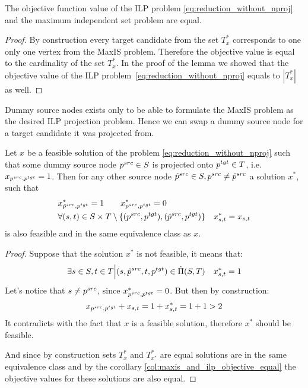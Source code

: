 \begin{corollary} \label{col:maxis_and_ilp_objective_equal}
  The objective function value of the ILP problem \eqref{eq:reduction_without_nproj} and the maximum independent
  set problem are equal.
\end{corollary}
\begin{proof}
  By construction every target candidate from the set \( T^*_x \) corresponds to one only one vertex
  from the MaxIS problem. Therefore the objective value is equal to the cardinality of the set \(  T^*_x \).
  In the proof of the lemma we showed that the objective value of the ILP problem~\eqref{eq:reduction_without_nproj}
  equals to \( | T^*_x| \) as well.
\end{proof}

Dummy source nodes exists only to be able to formulate the MaxIS problem as the desired ILP projection problem.
Hence we can swap a dummy source node for a target candidate it was projected from.
\begin{lemma} \label{lemma:swap_source_reduction}
  Let \( x \) be a feasible solution of the problem \eqref{eq:reduction_without_nproj} such that
  some dummy source node \( p^{src} \in S \) is projected onto \( p^{tgt} \in T \),
  i.e. \( x_{p^{src}, p^{tgt}} = 1 \). Then for any other source node
  \( \hat{p}^{src} \in S, p^{src} \neq \hat{p}^{src} \) a solution \( x^{*} \), such that
  \begin{align*}
    & x^*_{\hat{p}^{src}, p^{tgt}} = 1  \qquad
    x^*_{p^{src}, p^{tgt}} = 0                                                                                            \\
    & \forall (s, t) \in S \times T \setminus \{ (p^{src}, p^{tgt}), (\hat{p}^{src}, p^{tgt}) \} \quad x^*_{s,t} = x_{s,t}
  \end{align*}
  is also feasible and in the same equivalence class as \( x \).
\end{lemma}
\begin{proof}
  Suppose that the solution \( x^* \) is not feasible, it means that:
  \[
    \exists s \in S, t \in T \Big| (s, \hat{p}^{src}, t, p^{tgt}) \in \hat{\Pi}(S, T)
    \quad x^*_{s, t} = 1
  \]
  Let's notice that \( s \neq p^{src} \), since \( x^*_{p^{src}, p^{tgt}} = 0 \).
  But then by construction:
  \[
    x_{p^{src}, p^{tgt}} + x_{s, t} = 1 + x^*_{s, t} = 1 + 1 > 2
  \]
  It contradicts with the fact that \( x \) is a feasible solution, therefore \( x^* \) should be
  feasible.

  And since by construction sets \( T^*_x \) and \( T^*_{x^*} \) are equal solutions are in the same equivalence
  class and by the corollary \ref{col:maxis_and_ilp_objective_equal} the objective values for these solutions are also equal.
\end{proof}

